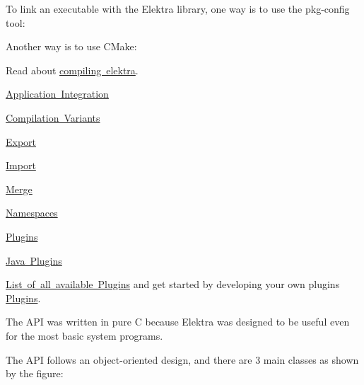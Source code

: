 To link an executable with the Elektra library, one way is to use the {\ttfamily pkg-\/config} tool\+:


\begin{DoxyCode}{0}
\end{DoxyCode}


Another way is to use C\+Make\+:


\begin{DoxyCode}{0}
\end{DoxyCode}


Read about \mbox{\hyperlink{doc_COMPILE_md}{compiling elektra}}.


\begin{DoxyItemize}
\item \mbox{\hyperlink{doc_tutorials_application-integration_md}{Application Integration}}
\item \mbox{\hyperlink{doc_tutorials_compilation-variants_md}{Compilation Variants}}
\item \mbox{\hyperlink{doc_tutorials_export_md}{Export}}
\item \mbox{\hyperlink{doc_tutorials_import_md}{Import}}
\item \mbox{\hyperlink{doc_tutorials_merge_md}{Merge}}
\item \mbox{\hyperlink{doc_tutorials_namespaces_md}{Namespaces}}
\item \mbox{\hyperlink{doc_tutorials_plugins_md}{Plugins}}
\item \mbox{\hyperlink{doc_tutorials_java-plugins_md}{Java Plugins}}
\end{DoxyItemize}

\mbox{\hyperlink{src_plugins_README_md}{List of all available Plugins}} and get started by developing your own plugins \mbox{\hyperlink{group__plugin}{Plugins}}.

The A\+PI was written in pure C because Elektra was designed to be useful even for the most basic system programs.

The A\+PI follows an object-\/oriented design, and there are 3 main classes as shown by the figure\+:



